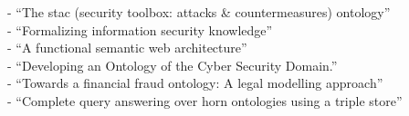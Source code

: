 - ``The stac (security toolbox: attacks \& countermeasures) ontology'' \citep{gyrard2013stac} \\
- ``Formalizing information security knowledge'' \citep{fenz2009formalizing} \\
- ``A functional semantic web architecture'' \citep{gerber2008functional} \\
- ``Developing an Ontology of the Cyber Security Domain.'' \citep{obrst2012developing} \\
- ``Towards a financial fraud ontology: A legal modelling approach'' \citep{kingston2004towards} \\
- ``Complete query answering over horn ontologies using a triple store'' \citep{zhou2013complete} \\

